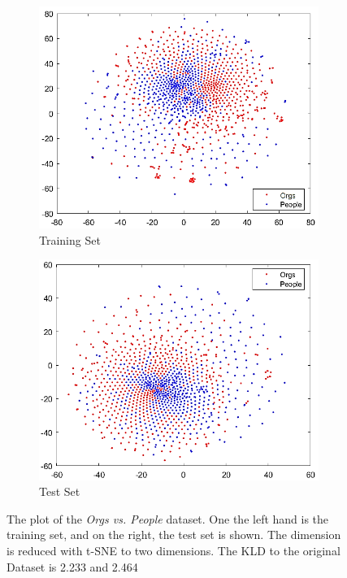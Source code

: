 \begin{figure}
	\centering
	\begin{subfigure}{.5\textwidth}
		\centering
		\includegraphics[width=1\linewidth]{figures/Plot_Train_OP_1.png}
		\caption{Training Set\label{FigOPSub1}}
	\end{subfigure}%
	\begin{subfigure}{.5\textwidth}
		\centering
		\includegraphics[width=1\linewidth]{figures/Plot_Test_OP_1.png}
		\caption{Test Set\label{FigOPSub2}}
	\end{subfigure}
	\caption[Plot of Orgs vs. People Dataset]{The plot of the \textit{Orgs vs. People} dataset. One the left hand is the training set, and on the right, the test set is shown. The dimension is reduced with t-SNE to two dimensions. The \acs{KLD} to the original Dataset is 2.233 and 2.464 	\label{FigOrgVsPeoplePlot}}
\end{figure}

